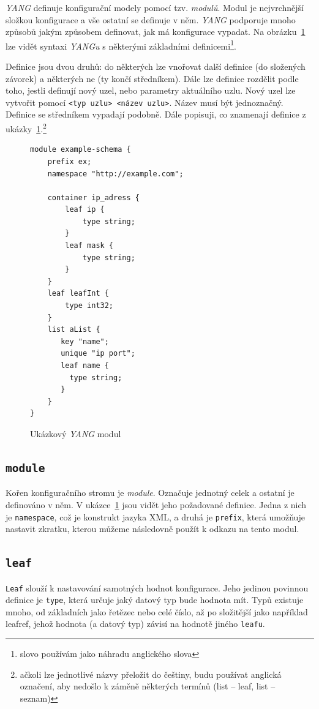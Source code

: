 \documentclass[thesis=B,czech,hidelinks]{FITthesis}[2019/03/06]
\begin{document}
\textit{YANG} definuje konfigurační modely pomocí tzv. \textit{modulů}. Modul je nejvrchnější složkou konfigurace a vše ostatní se definuje v něm. \textit{YANG} podporuje mnoho způsobů jakým způsobem definovat, jak má konfigurace vypadat. Na obrázku~\ref{yang:ukazka} lze vidět syntaxi \textit{YANGu} s některými základními definicemi\footnote{slovo  používám jako náhradu anglického slova }.

Definice jsou dvou druhů: do některých lze vnořovat další definice (do složených závorek) a některých ne (ty končí středníkem). Dále lze definice rozdělit podle toho, jestli definují nový uzel, nebo parametry aktuálního uzlu. Nový uzel lze vytvořit pomocí \texttt{<typ~uzlu>~<název~uzlu>}. Název musí být jednoznačný. Definice se středníkem vypadají podobně. Dále popisuji, co znamenají definice z ukázky~\ref{yang:ukazka}.\footnote{ačkoli lze jednotlivé názvy přeložit do češtiny, budu používat anglická označení, aby nedošlo k záměně některých termínů (list -- leaf, list -- seznam)}

\begin{figure}
\begin{verbatim}
module example-schema {
    prefix ex;
    namespace "http://example.com";

    container ip_adress {
        leaf ip {
            type string;
        }
        leaf mask {
            type string;
        }
    }
    leaf leafInt {
        type int32;
    }
    list aList {
       key "name";
       unique "ip port";
       leaf name {
         type string;
       }
    }
}
\end{verbatim}
\caption{Ukázkový \textit{YANG} modul}\label{yang:ukazka}
\end{figure}
\subsection{\texttt{module}}
Kořen konfiguračního stromu je \textit{module}. Označuje jednotný celek a ostatní je definováno v něm. V ukázce~\ref{yang:ukazka} jsou vidět jeho požadované definice. Jedna z nich je \texttt{namespace}, což je konstrukt jazyka XML, a druhá je \texttt{prefix}, která umožňuje nastavit zkratku, kterou můžeme následovně použít k odkazu na tento modul.

\subsection{\texttt{leaf}}
\texttt{Leaf} slouží k nastavování samotných hodnot konfigurace. Jeho jedinou povinnou definice je \texttt{type}, která určuje jaký datový typ bude hodnota mít. Typů existuje mnoho, od základních jako řetězec nebo celé číslo, až po složitější jako například leafref, jehož hodnota (a datový typ) závisí na hodnotě jiného \texttt{leafu}.
\end{document}

